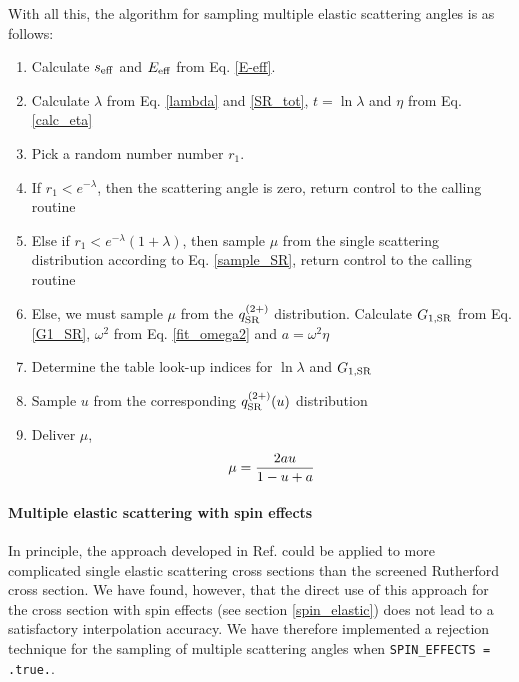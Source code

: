 With all this, the algorithm for sampling multiple elastic scattering
angles is as follows:
\begin{enumerate}
\item
Calculate $s_{\rm eff}$ and $E_{\rm eff}$ from Eq. \eqref{E-eff}.
\item
Calculate $\lambda$ from Eq. \eqref{lambda} and \eqref{SR_tot},
$t = \ln \lambda$  and $\eta$ from Eq. \eqref{calc_eta}
\item
Pick a random number number $r_1$.
\item
If $r_1 < e^{-\lambda}$, then the scattering angle is zero, return
control to the calling routine
\item
Else if $r_1 < e^{-\lambda}(1 + \lambda)$, then sample $\mu$ from
the single scattering distribution according to Eq. \eqref{sample_SR},
return
control to the calling routine
\item
Else, we must sample $\mu$ from the $q^{(2+)}_{\rm SR}$ distribution.
Calculate $G_{1,{\rm SR}}$ from Eq. \eqref{G1_SR},
$\omega^2$ from Eq. \eqref{fit_omega2} and
$a = \omega^2 \eta$
\item
Determine the table look-up indices for $\ln \lambda$ and $G_{1,{\rm SR}}$
\item
Sample $u$ from the corresponding $q^{(2+)}_{\rm SR}(u)$ distribution
\item
Deliver $\mu$,
\begin{equation}
\mu = {2 a u \over 1 - u + a}
\end{equation}
\end{enumerate}


\paragraph{Multiple elastic scattering with spin effects} \hfill

In principle, the approach developed in Ref. \cite{KB97} could
be applied to more complicated single elastic scattering cross
sections than the screened Rutherford cross section.
We have found, however, that the direct use of this approach for
the cross section with spin effects (see section \ref{spin_elastic})
does not lead to a satisfactory interpolation accuracy. We have
therefore implemented a rejection technique for the sampling
of multiple scattering angles when {\tt SPIN\_EFFECTS = .true.}.

